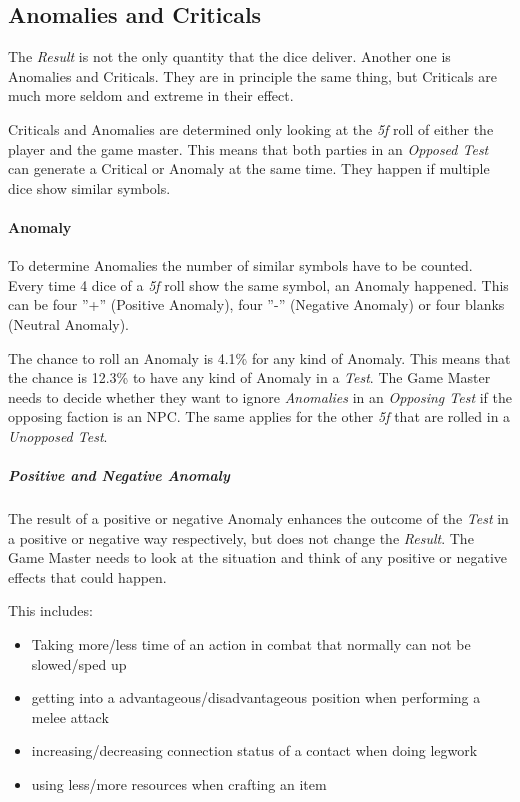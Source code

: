 \subsection{Anomalies and Criticals}

The \emph{Result} is not the only quantity that the dice deliver. Another one is
Anomalies and Criticals. They are in principle the same thing, but Criticals are
much more seldom and extreme in their effect.

Criticals and Anomalies are determined only looking at the \emph{5f} roll of either
the player and the game master. This means that both parties in an \emph{Opposed Test}
can generate a Critical or Anomaly at the same time. They happen if multiple dice
show similar symbols.

\paragraph{Anomaly}
To determine Anomalies the number of similar symbols have to be counted. Every time
4 dice of a \emph{5f} roll show the same symbol, an Anomaly happened.
This can be four ''+'' (Positive Anomaly), four ''-'' (Negative Anomaly) or four
blanks (Neutral Anomaly).

The chance to roll an Anomaly is 4.1\% for any kind of Anomaly. This means that the
chance is 12.3\% to have any kind of Anomaly in a \emph{Test}. The Game Master
needs to decide whether they want to ignore \emph{Anomalies} in an
\emph{Opposing Test} if the opposing faction is an NPC. The same applies for the other \emph{5f} that are
rolled in a \emph{Unopposed Test}.

\subparagraph{Positive and Negative Anomaly}
The result of a positive or negative Anomaly enhances the outcome of the
\emph{Test} in a positive or negative way respectively, but does not change the
\emph{Result}. The Game Master needs to look at the situation and think of any
positive or negative effects that could happen.

This includes:
\begin{itemize}[parsep=0em]
    \item Taking more/less time of an action in combat that normally can not
          be slowed/sped up
    \item getting into a advantageous/disadvantageous position when performing a
          melee attack
    \item increasing/decreasing connection status of a contact when doing legwork
    \item using less/more resources when crafting an item
\end{itemize}

